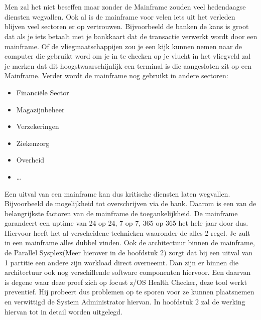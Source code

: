 
\chapter{}
\label{ch:inleiding}

Men zal het niet beseffen maar zonder de Mainframe zouden veel hedendaagse diensten wegvallen. Ook al is de mainframe voor velen iets uit het verleden blijven veel sectoren er op vertrouwen. Bijvoorbeeld de banken de kans is groot dat als je iets betaalt met je bankkaart dat de transactie verwerkt wordt door een mainframe. Of de vliegmaatschappijen zou je een kijk kunnen nemen naar de computer die gebruikt word om je in te checken op je vlucht in het vliegveld zal je merken dat dit hoogstwaarschijnlijk een terminal is die aangesloten zit op een Mainframe. Verder wordt de mainframe nog gebruikt in andere sectoren:


\begin{itemize}
  \item Financiële Sector
  \item Magazijnbeheer
  \item Verzekeringen
  \item Ziekenzorg
  \item Overheid
  \item \ldots
\end{itemize}

Een uitval van een mainframe kan dus kritische diensten laten wegvallen. Bijvoorbeeld de mogelijkheid tot overschrijven via de bank. Daarom is een van de belangrijkste factoren van de mainframe de toegankelijkheid. De mainframe garandeert een uptime van 24 op 24, 7 op 7, 365 op 365 het hele jaar door dus. Hiervoor heeft het al verscheidene technieken waaronder de alles 2 regel. Je zult in een mainframe alles dubbel vinden. Ook de architectuur binnen de mainframe, de Parallel Sysplex(Meer hierover in de hoofdstuk 2) zorgt dat bij een uitval van 1 partitie een andere zijn workload direct overneemt. Dan zijn er binnen die architectuur ook nog verschillende software componenten hiervoor. Een daarvan is degene waar deze proef zich op focust z/OS Health Checker, deze tool werkt preventief. Hij probeert dus problemen op te sporen voor ze kunnen plaatsnemen en verwittigd de System Administrator hiervan. In hoofdstuk 2 zal de werking hiervan tot in detail worden uitgelegd.

